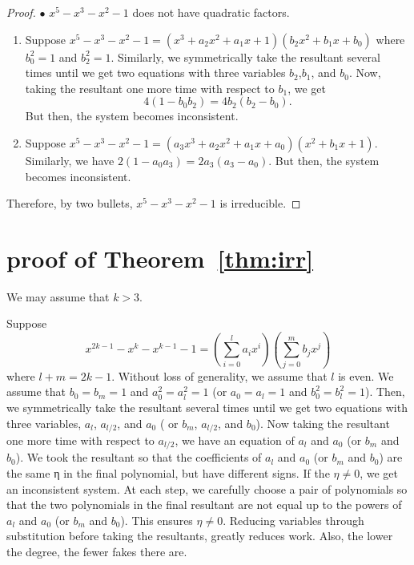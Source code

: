 \documentclass{amsart}
\theoremstyle{definition}
\theoremstyle{remark}
\begin{document}
\begin{proof}
$\bullet$ $x^5-x^3-x^2-1$ does not have quadratic factors.
\begin{enumerate} 
\item[I.] Suppose $x^5-x^3-x^2-1=(x^3+a_2 x^2+a_1 x+1)(b_2 x^2+b_1 x+b_0)$ where $b_0^2=1$ and $b_2^2=1$.
Similarly, we symmetrically take the resultant several times until we get two equations with three variables $b_2$,$b_1$, and $b_0$.
Now, taking the resultant one more time with respect to $b_1$, we get
 \begin{equation*}
 4(1-b_0 b_2)=4b_2(b_2-b_0) .
\end{equation*}
But then, the system becomes inconsistent.
\item[II.] Suppose $x^5-x^3-x^2-1=(a_3 x^3+a_2 x^2+a_1 x+a_0)(x^2+b_1 x+1)$.
Similarly, we have $2(1-a_0 a_3)=2a_3(a_3-a_0).$
But then, the system becomes inconsistent.
\end{enumerate}

Therefore, by two bullets, $x^5-x^3-x^2-1$ is irreducible.
\end{proof}

\section{proof of Theorem~\ref{thm:irr}} \label{sec:proof}

We may assume that $k > 3$.

Suppose $$x^{2k-1}-x^k-x^{k-1}-1=  \left(\sum_{i=0}^{l} a_i x^i \right)  \left(\sum_{j=0}^{m} b_j x^j \right)$$ where $l+m=2k-1$.
Without loss of generality, we assume that $l$ is even. We assume that $b_0=b_m=1$  and $a_0^2=a_l^2=1$ (or $a_0=a_l=1$ and $b_0^2=b_l^2=1$). Then, we symmetrically take the resultant several times until we get two equations with three variables, $a_l$, $a_{l/2}$, and $a_0$ ( or $b_m$, $a_{l/2}$, and $b_0$). 
Now taking the resultant one more time with respect to $a_{l/2}$, we have an equation of $a_l$ and $a_0$ (or $b_m$ and $b_0$). We took the resultant so that the coefficients of $a_l$ and $a_0$ (or $b_m$ and $b_0$) are the same η in the final polynomial,  but have different signs. 
If the $\eta \neq 0$, we get an inconsistent system.  At each step, we carefully choose a pair of polynomials so that the two polynomials in the final resultant are not equal up to the powers of $a_l$ and $a_0$ (or $b_m$ and $b_0$). This ensures $\eta \neq 0$. 
Reducing variables through substitution before taking the resultants, greatly reduces work.  Also, the lower the degree, the fewer fakes there are.
\end{document}
